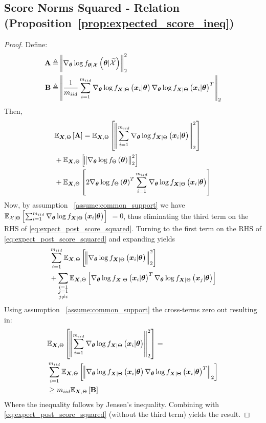 \subsection{%
  Score Norms Squared - Relation (Proposition~\ref{prop:expected_score_ineq})}\label{apx:remark_c_relation_proof}


\begin{proof}
   Define:
    \begin{align*}
        \matsym{A}&\triangleq \norm{\nabla_{\p}\log\probt{\p|\xsetr}{\p|\xset}}_2^2\\
        \matsym{B}&\triangleq\norm{\frac{1}{\niiddata}\sum_{i=1}^{\niiddata}\nabla_{\p}\log\probt{\x_i|\p}{\X|\pr}\nabla_{\p}\log\probt{\x_i|\p}{\X|\pr}^T}_2
    \end{align*}
Then, 
\begin{align}
    &\expectation{\matsym{A}}{\X,\pr}=\expectation{\norm{\sum_{i=1}^{\niiddata}\nabla_{\p}\log\probt{\x_i|\p}{\X|\pr}}_2^2}{\X,\pr}\nonumber\\
    &+\expectation{\norm{\nabla_{\p}\log\probt{\p}{\pr}}_2^2}{\X,\pr}\nonumber\\
    &+\expectation{2\nabla_{\p}\log\probt{\p}{\pr}^T\sum_{i=1}^{\niiddata}\nabla_{\p}\log\probt{\x_i|\p}{\X|\pr}}{\X,\pr} \label{eq:expect_post_score_squared}
\end{align}
Now, by  assumption ~\ref{assume:common_support} we have $\expectation{\sum_{i=1}^{\niiddata}\nabla_{\p}\log\probt{\x_i|\p}{\X|\pr}}{\xset|\pr}$ $=0$, {thus %
eliminating the third term on the RHS of \eqref{eq:expect_post_score_squared}.} Turning to the first term on the RHS of \eqref{eq:expect_post_score_squared} and expanding yields
\begin{align*}
{
    } 
    &\sum_{i=1}^{\niiddata}\expectation{\norm{\nabla_{\p}\log\probt{\x_i|\p}{\X|\pr}}_2^2}{\X,\pr}\nonumber\\
    &+\sum_{\substack{i=1\\
    j=1\\ 
    j\neq i} }\expectation{\nabla_{\p}\log\probt{\x_i|\p}{\X|\pr}^T\nabla_{\p}\log\probt{\x_{j}|\p}{\X|\pr}}{\X,\pr}\nonumber
\end{align*}
Using assumption ~\ref{assume:common_support} the cross-terms zero out resulting in:
\begin{align*}
    &\expectation{\norm{\sum_{i=1}^{\niiddata}\nabla_{\p}\log\probt{\x_i|\p}{\X|\pr}}_2^2}{\X,\pr}
    =\nonumber\\
    &\sum_{i=1}^{\niiddata}\expectation{\norm{\nabla_{\p}\log\probt{\x_i|\p}{\X|\pr}\nabla_{\p}\log\probt{\x_i|\p}{\X|\pr}^T}_2}{\X,\pr}\nonumber\\
    &\geq \niiddata \expectation{\matsym{B}}{\X,\pr}
\end{align*}
Where the inequality  follows by Jensen's inequality. {Combining with \eqref{eq:expect_post_score_squared} (without the third term) yields the result.}
\end{proof}

